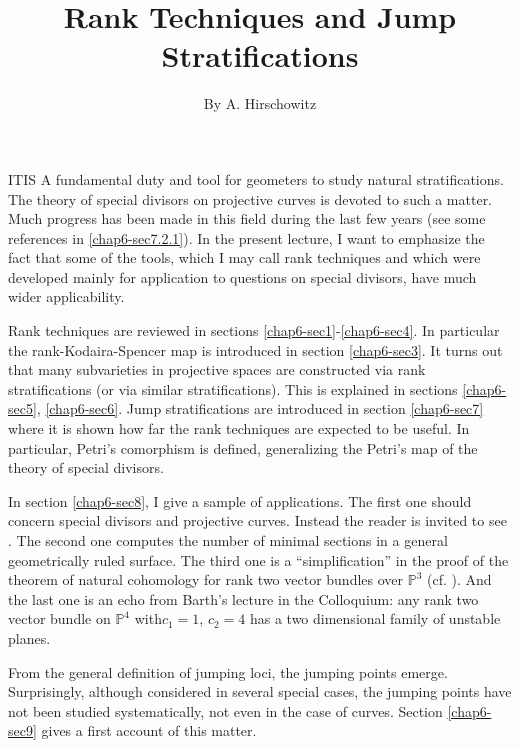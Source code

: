 \title{Rank Techniques and Jump Stratifications}\label{chap6}

\author{By A. Hirschowitz}

\date{}
\maketitle

\setcounter{page}{115}

\setcounter{pageoriginal}{158}
IT\pageoriginale IS A fundamental duty and tool for geometers to study
natural stratifications. The theory of special divisors on projective
curves is devoted to such a matter. Much progress has been made in
this field during the last few years (see some references in
\ref{chap6-sec7.2.1}). In the present lecture, I want to emphasize the fact that some
of the tools, which I may call rank techniques and which were
developed mainly for application to questions on special divisors,
have much wider applicability. 

Rank techniques are reviewed in
sections \ref{chap6-sec1}-\ref{chap6-sec4}. In particular the 
rank-Kodaira-Spencer map is introduced in section \ref{chap6-sec3}. It
turns out that many subvarieties in projective spaces are constructed
via rank stratifications (or via similar stratifications). This is
explained in sections \ref{chap6-sec5}, \ref{chap6-sec6}. Jump
stratifications are introduced in section \ref{chap6-sec7} where it is
shown how far the rank techniques are expected to be useful. In
particular, Petri's comorphism is defined, generalizing the Petri's
map of the theory of special divisors.

In section \ref{chap6-sec8}, I give a sample of applications. The
first one should concern special divisors and projective
curves. Instead the reader is invited to see \cite{chap6-Ha}. The
second one computes the number of minimal sections in a general
geometrically ruled surface. The third one is a ``simplification'' in
the proof of the theorem of natural cohomology for rank two vector
bundles over $\mathbb{P}^{3}$ (cf. \cite{chap6-HH2}). And the last one
is an echo from Barth's lecture in the Colloquium: any rank two vector
bundle on $\mathbb{P}^{4}$ with\pageoriginale $c_{1}=1$, $c_{2}=4$ has a two
dimensional family of unstable planes.

From the general definition of jumping loci, the jumping points
emerge. Surprisingly, although considered in several special cases,
the jumping points have not been studied systematically, not even in
the case of curves. Section \ref{chap6-sec9} gives a first account of
this matter.

